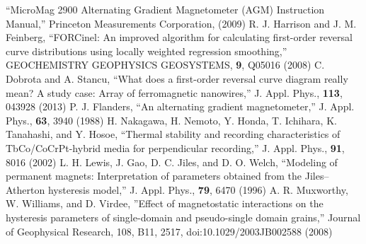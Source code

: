 \documentclass[aps,twocolumn,groupedaddress]{revtex4}
\begin{document}
\begin{thebibliography}{}
 ``MicroMag 2900 Alternating Gradient Magnetometer (AGM) Instruction Manual,'' Princeton Measurements Corporation, (2009)
 R. J. Harrison and J. M. Feinberg, ``FORCinel: An improved algorithm for calculating first-order reversal curve distributions using locally weighted regression smoothing,'' GEOCHEMISTRY GEOPHYSICS GEOSYSTEMS, {\bf 9}, Q05016 (2008)
 C. Dobrota and A. Stancu, ``What does a first-order reversal curve diagram really mean? A study case: Array of ferromagnetic nanowires,'' J. Appl. Phys., {\bf 113},
043928 (2013)
 P. J. Flanders, ``An alternating gradient magnetometer,'' J. Appl. Phys., {\bf 63}, 3940 (1988)
 H. Nakagawa, H. Nemoto, Y. Honda, T. Ichihara, K. Tanahashi, and Y. Hosoe, ``Thermal stability and recording characteristics of TbCo/CoCrPt-hybrid media for perpendicular recording,'' J. Appl. Phys., {\bf 91}, 8016 (2002)
 L. H. Lewis, J. Gao, D. C. Jiles, and D. O. Welch, ``Modeling of permanent magnets: Interpretation of parameters obtained from the Jiles–Atherton hysteresis model,'' J. Appl. Phys., {\bf 79},  6470 (1996)
 A. R. Muxworthy, W. Williams, and D. Virdee, ''Effect of magnetostatic interactions on the hysteresis parameters of single-domain and pseudo-single domain grains,'' Journal of Geophysical Research, 108, B11, 2517, doi:10.1029/2003JB002588 (2008)
\end{thebibliography}
\end{document}
